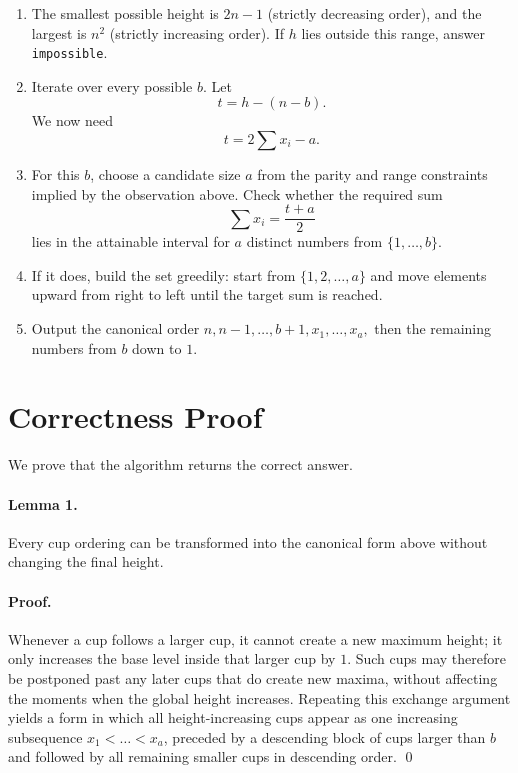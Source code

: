 \documentclass[11pt]{article}
\begin{document}
\begin{enumerate}[leftmargin=*]
    \item The smallest possible height is $2n-1$ (strictly decreasing order), and the largest is $n^2$
    (strictly increasing order). If $h$ lies outside this range, answer \texttt{impossible}.
    \item Iterate over every possible $b$. Let
    \[
    t = h - (n-b).
    \]
    We now need
    \[
    t = 2\sum x_i - a.
    \]
    \item For this $b$, choose a candidate size $a$ from the parity and range constraints implied by the
    observation above. Check whether the required sum
    \[
    \sum x_i = \frac{t+a}{2}
    \]
    lies in the attainable interval for $a$ distinct numbers from $\{1,\dots,b\}$.
    \item If it does, build the set greedily:
    start from $\{1,2,\dots,a\}$ and move elements upward from right to left until the target sum is
    reached.
    \item Output the canonical order
    $n,n-1,\dots,b+1,x_1,\dots,x_a,$ then the remaining numbers from $b$ down to $1$.
\end{enumerate}

\section*{Correctness Proof}

We prove that the algorithm returns the correct answer.

\paragraph{Lemma 1.}
Every cup ordering can be transformed into the canonical form above without changing the final height.

\paragraph{Proof.}
Whenever a cup follows a larger cup, it cannot create a new maximum height; it only increases the base
level inside that larger cup by $1$. Such cups may therefore be postponed past any later cups that do
create new maxima, without affecting the moments when the global height increases. Repeating this
exchange argument yields a form in which all height-increasing cups appear as one increasing subsequence
$x_1<\dots<x_a$, preceded by a descending block of cups larger than $b$ and followed by all remaining
smaller cups in descending order. \qed
\end{document}
